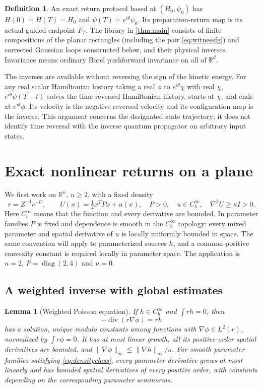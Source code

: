 \documentclass[11pt]{article}
\numberwithin{equation}{section}
\newtheorem{lemma}[lemma]{Lemma}
\theoremstyle{definition}
\newtheorem{definition}[definition]{Definition}
\newcommand{\R}{\mathbb R}
\newcommand{\Cb}{C_b^\infty}
\newcommand{\diver}{\operatorname{div}}
\newcommand{\diag}{\operatorname{diag}}
\begin{document}
\begin{definition}\label{def:return}
An exact return protocol based at $(H_0,\psi_0)$ has
$H(0)=H(T)=H_0$ and $\psi(T)=e^{i\theta}\psi_0$.
Its preparation-return map is its actual guided endpoint $F_T$.
The library in \cref{thm:main} consists of finite compositions of
the planar rectangles (including the pair \eqref{eq:witnessfg}) and
corrected Gaussian loops constructed below, and their physical inverses.
Invariance means ordinary Borel
pushforward invariance on all of $\R^d$.
\end{definition}

The inverses are available without reversing the sign of the kinetic
energy. For any real scalar Hamiltonian history taking a real
$\phi$ to $e^{i\theta}\chi$ with real $\chi$,
$e^{i\theta}\overline{\psi(T-t)}$ solves the time-reversed Hamiltonian
history, starts at $\chi$, and ends at $e^{i\theta}\phi$. Its velocity
is the negative reversed velocity and its configuration map is the
inverse. This argument concerns the designated state trajectory;
it does not identify time reversal with the inverse quantum propagator
on arbitrary input states.

\section{Exact nonlinear returns on a plane}\label{sec:plane}

We first work on $\R^n$, $n\geq2$, with a fixed density
\begin{equation}\label{eq:densityclass}
 r=Z^{-1}e^{-U},\qquad
 U(x)=\tfrac12x^TPx+u(x),\quad P>0,\quad u\in\Cb,\quad
 \nabla^2U\geq\kappa I>0.
\end{equation}
Here $\Cb$ means that the function and every derivative are bounded.
In parameter families $P$ is fixed and dependence is smooth in the
$C_b^\infty$ topology: every mixed parameter and spatial derivative
of $u$ is locally uniformly bounded in space. The same convention
will apply to parameterized sources $h$, and a common positive
convexity constant is required locally in parameter space. The application
is $n=2$, $P=\diag(2,4)$ and $u=0$.

\subsection{A weighted inverse with global estimates}

\begin{lemma}[Weighted Poisson equation]\label{lem:poisson}
If $h\in\Cb$ and $\int rh=0$, then
\begin{equation}\label{eq:poisson}
 -\diver(r\nabla\phi)=rh
\end{equation}
has a solution, unique modulo constants among functions with
$\nabla\phi\in L^2(r)$, normalized by $\int r\phi=0$.
It has at most linear growth, all its positive-order spatial
derivatives are bounded, and
$\|\nabla\phi\|_\infty\leq\|\nabla h\|_\infty/\kappa$.
For smooth parameter families satisfying \eqref{eq:densityclass},
every parameter derivative grows at most linearly and has bounded
spatial derivatives of every positive order, with constants depending
on the corresponding parameter seminorms.
\end{lemma}
\end{document}
